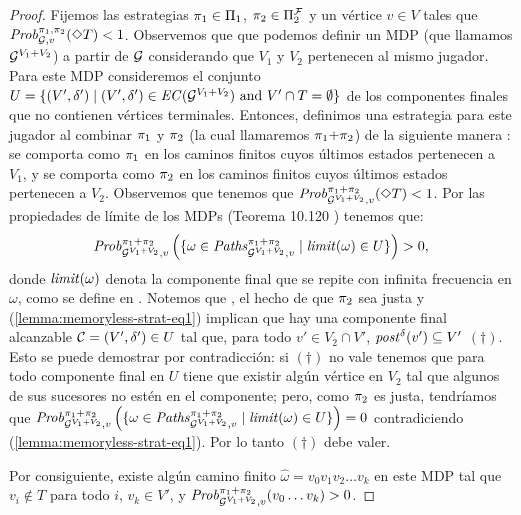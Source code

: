 \begin{proof}
  Fijemos las estrategias $\pi_{1} \in \Pi_{1}$, $\pi_{2} \in
  \Pi^{\mathcal{F}}_{2}$ y un vértice $v \in V$ tales que
  $\mathit{Prob}^{\pi_{1}, \pi_{2}}_{\mathcal{G}, v}(\Diamond T) < 1$.
  Observemos que que podemos definir un MDP (que llamamos $\mathcal{G}^{V_1{+}V_2}$) a partir de
  $\mathcal{G}$ considerando que $V_1$ y $V_2$ pertenecen al mismo jugador.  Para este MDP consideremos el conjunto $U = \{ (V',\delta')
  \mid(V',\delta') \in \mathit{EC}(\mathcal{G}^{V_1{+}V_2}) \text{ and }
  V'\cap T = \emptyset \}$ de los componentes finales que no contienen vértices terminales. Entonces, definimos una estrategia para este jugador al combinar
  $\pi_{1}$ y $\pi_{2}$ (la cual llamaremos $\pi_{1}{+}\pi_{2}$) de la siguiente manera
  : se comporta como $\pi_{1}$ en los caminos finitos cuyos últimos estados pertenecen a $V_1$, y se comporta como $\pi_{2}$ en los caminos finitos cuyos últimos estados pertenecen a $V_2$. Observemos que tenemos que
  $\mathit{Prob}^{\pi_{1}{+}\pi_{2}}_{\mathcal{G}^{V_1+V_2},v}(\Diamond T) <
  1$. Por las propiedades de límite de los MDPs (Teorema 10.120 \cite{BaierK08})
  tenemos que:
  \begin{equation}\label{lemma:memoryless-strat-eq1}
    \mathit{Prob}^{\pi_{1}{+}\pi_{2}}_{\mathcal{G}^{V_1+V_2},v} \left(\{ \omega \in \mathit{Paths}^{\pi_{1}{+}\pi_{2}}_{\mathcal{G}^{V_1+V_2},v} \mid \mathit{limit}(\omega)  \in U \}\right) > 0,
  \end{equation}
  donde $\mathit{limit}(\omega)$ denota la componente final que se repite con infinita frecuencia en $\omega$, como se define en \cite{BaierK08}.  Notemos que
  , el hecho de que $\pi_{2}$ sea justa y
  (\ref{lemma:memoryless-strat-eq1}) implican que hay una componente final alcanzable $\mathcal{C}= (V',\delta') \in U$ tal que, para todo
  $v' \in V_2 \cap V'$, $\mathit{post}^\delta(v') \subseteq V'$ $(\dag)$.
  Esto se puede demostrar por contradicción: si $(\dag)$ no vale tenemos que para todo componente final en $U$ tiene que existir
  algún vértice en
  $V_2$ tal que algunos de sus sucesores no estén en el componente; pero,
  como $\pi_{2}$ es justa, tendríamos que
  $\mathit{Prob}^{\pi_{1}{+}\pi_{2}}_{\mathcal{G}^{V_1+V_2},v} \left ( \{ \omega \in \mathit{Paths}^{\pi_{1}{+}\pi_{2}}_{\mathcal{G}^{V_1+V_2},v} \mid \mathit{limit}(\omega) \in U \}\right) = 0$
  contradiciendo (\ref{lemma:memoryless-strat-eq1}). Por lo tanto $(\dag)$ debe valer.

  Por consiguiente, existe algún camino finito $\hat{\omega} = v_0 v_1 v_2 \dots v_k$
  en este MDP tal que $v_i \notin T$ para todo $i$, $v_k \in V'$, y
  $\mathit{Prob}^{\pi_{1}{+}\pi_{2}}_{\mathcal{G}^{V_1+V_2},v}(v_0\dots v_k) > 0$.


\end{proof}
